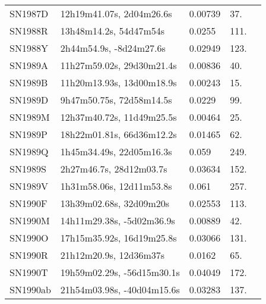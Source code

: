 \begin{longtable}{lllll}
          SN1987D &       12h19m41.07s, 2d04m26.6s &  0.00739 &            37. &    \citet{1998ApJS..119..277G} \\
          SN1988R &         13h48m14.2s, 54d47m54s &   0.0255 &           111. &    \citet{1999PASP..111..438F} \\
          SN1988Y &        2h44m54.9s, -8d24m27.6s &  0.02949 &           123. &    \citet{2003SDSS1.C...0000:} \\
          SN1989A &      11h27m59.02s, 29d30m21.4s &  0.00836 &            40. &    \citet{1991RC3.9.C...0000d} \\
          SN1989B &      11h20m13.93s, 13d00m18.9s &  0.00243 &            15. &    \citet{1991RC3.9.C...0000d} \\
          SN1989D &       9h47m50.75s, 72d58m14.5s &   0.0229 &            99. &    \citet{2000UZC...C......0F} \\
          SN1989M &      12h37m40.72s, 11d49m25.5s &  0.00464 &            25. &    \citet{2005SDSS4.C...0000:} \\
          SN1989P &      18h22m01.81s, 66d36m12.2s &  0.01465 &            62. &  \citet{1998AandAS..130..333T} \\
          SN1989Q &       1h45m34.49s, 22d05m16.3s &    0.059 &           249. &    \citet{1993BICDS..42...17T} \\
          SN1989S &        2h27m46.7s, 28d12m03.7s &  0.03634 &           152. &    \citet{1991RC3.9.C...0000d} \\
          SN1989V &       1h31m58.06s, 12d11m53.8s &    0.061 &           257. &    \citet{1993BICDS..42...17T} \\
          SN1990F &        13h39m02.68s, 32d09m20s &  0.02553 &           113. &    \citet{2003AJ....126.2152R} \\
          SN1990M &      14h11m29.38s, -5d02m36.9s &  0.00889 &            42. &    \citet{2011MNRAS.413..813C} \\
          SN1990O &      17h15m35.92s, 16d19m25.8s &  0.03066 &           131. &    \citet{1996AJ....112.1803M} \\
          SN1990R &         21h12m20.9s, 12d36m37s &   0.0162 &            65. &    \citet{2006HIPAS.C...0000:} \\
          SN1990T &     19h59m02.29s, -56d15m30.1s &  0.04049 &           172. &    \citet{20096dF...C...0000J} \\
         SN1990ab &     21h54m03.98s, -40d04m15.6s &  0.03283 &           137. &    \citet{2000MNRAS.317...55S} \\

\end{longtable}
